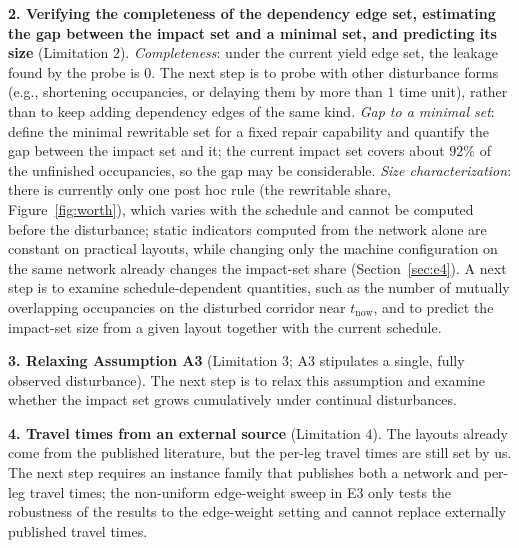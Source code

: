 \documentclass[manuscript,screen,review]{acmart}
\newcommand{\ClosureAliveFrac}{92\%}
\newcommand{\ProbeLeaks}{0}
\begin{document}
\textbf{2. Verifying the completeness of the dependency edge set, estimating the gap between the impact set and a minimal set, and predicting its size} (Limitation \(2\)).
\emph{Completeness}: under the current yield edge set, the leakage found by the probe is \ProbeLeaks.
The next step is to probe with other disturbance forms (e.g., shortening occupancies, or delaying them by more than \(1\) time unit), rather than to keep adding dependency edges of the same kind.
\emph{Gap to a minimal set}: define the minimal rewritable set for a fixed repair capability and quantify the gap between the impact set and it; the current impact set covers about
\(\ClosureAliveFrac\) of the unfinished occupancies, so the gap may be considerable. \emph{Size characterization}: there is currently only one post hoc rule (the rewritable share, Figure~\ref{fig:worth}), which varies with the schedule and cannot be computed before the disturbance;
static indicators computed from the network alone are constant on practical layouts, while changing only the machine configuration on the same network already changes the impact-set share (Section~\ref{sec:e4}).
A next step is to examine schedule-dependent quantities, such as the number of mutually overlapping occupancies on the disturbed corridor near \(t_{\mathrm{now}}\),
and to predict the impact-set size from a given layout together with the current schedule.

\textbf{3. Relaxing Assumption A3} (Limitation \(3\); A3 stipulates a single, fully observed disturbance).
The next step is to relax this assumption and examine whether the impact set grows cumulatively under continual disturbances.

\textbf{4. Travel times from an external source} (Limitation \(4\)). The layouts already come from the published literature, but the per-leg travel times are still set by us.
The next step requires an instance family that publishes both a network and per-leg travel times; the non-uniform edge-weight sweep in E3 only tests the robustness of the results to the edge-weight setting
and cannot replace externally published travel times.



\end{document}
